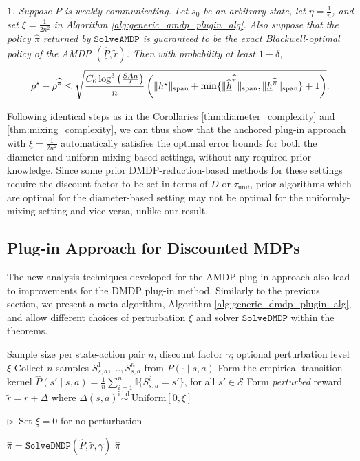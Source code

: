 \documentclass{article}
\theoremstyle{plain}
\newtheorem{thm}{\protect\theoremname}
\theoremstyle{plain}
\theoremstyle{remark}
\theoremstyle{plain}
\theoremstyle{plain}
\providecommand{\theoremname}{Theorem}
\newcommand{\Phat}{\widehat{P}}
\newcommand{\ind}{\mathbb{I}}
\newcommand{\pihat}{\widehat{\pi}}
\newcommand{\hhat}{\widehat{h}}
\newcommand{\A}{\mathcal{A}}
\renewcommand{\S}{\mathcal{S}}
\newcommand{\tmix}{\tau_{\mathrm{unif}}}
\newcommand{\SolveAMDP}{\texttt{SolveAMDP}}
\newcommand{\SolveDMDP}{\texttt{SolveDMDP}}
\newcommand{\Phatanc}{\underline{\Phat}}
\newcommand{\hhatanc}{\underline{\hhat}}
\newcommand{\hanc}{\underline{h}}
\newcommand{\plugin}{plug-in\xspace}
\newcommand{\Plugin}{Plug-in\xspace}
\renewcommand{\algorithmiccomment}[1]{\begin{flushright}$\triangleright$~#1\end{flushright}}
\begin{document}
\begin{thm}
    \label{thm:AMDP_best_of_both}
    Suppose $P$ is weakly communicating. Let $s_0$ be an arbitrary state, let $\eta = \frac{1}{n}$, and set $\xi = \frac{1}{2n^2}$ in Algorithm \ref{alg:generic_amdp_plugin_alg}. Also suppose that the policy $\pihat$ returned by $\SolveAMDP$ is guaranteed to be the exact Blackwell-optimal policy of the AMDP $(\Phatanc, \widetilde{r})$.
    Then with probability at least $1 - \delta$,
    \begin{align*}
        \rho^\star - \rho^{\pihat}  \leq \sqrt{\frac{C_6  \log^3 \left( \frac{SAn}{ \delta }\right) }{n}\left( \spannorm{h^\star} + \min\{\spannorm{\hhatanc^{\pihat}},  \spannorm{\hanc^{\pihat}} \} + 1\right) }.
    \end{align*}
\end{thm}
Following identical steps as in the Corollaries \ref{thm:diameter_complexity} and \ref{thm:mixing_complexity}, we can thus show that the anchored \plugin approach with $\xi = \frac{1}{2n^2}$ automatically satisfies the optimal error bounds for both the diameter and uniform-mixing-based settings, without any required prior knowledge. Since some prior DMDP-reduction-based methods for these settings require the discount factor to be set in terms of $D$ or $\tmix$, prior algorithms which are optimal for the diameter-based setting may not be optimal for the uniformly-mixing setting and vice versa, unlike our result.

\subsection{\Plugin Approach for Discounted MDPs}
The new analysis techniques developed for the AMDP \plugin approach also lead to improvements for the DMDP \plugin method. Similarly to the previous section, we present a meta-algorithm, Algorithm \ref{alg:generic_dmdp_plugin_alg}, and allow different choices of perturbation $\xi$ and solver $\SolveDMDP$ within the theorems.

\begin{algorithm}[t]
\caption{\Plugin approach for DMDP} \label{alg:generic_dmdp_plugin_alg}
\begin{algorithmic}[1]
\Require Sample size per state-action pair $n$, discount factor $\gamma$; optional perturbation level $\xi$
\For{each state-action pair $(s,a) \in \S \times \A$}
\State Collect $n$ samples $S^1_{s,a}, \dots, S^n_{s,a}$ from $P(\cdot \mid s,a)$
\State Form the empirical transition kernel $\Phat(s' \mid s, a) = \frac{1}{n}\sum_{i=1}^n \ind\{S^i_{s,a} = s'\}$, for all $s' \in \S$
\EndFor
\State Form \textit{perturbed} reward $\widetilde{r} = r + \Delta$ where $\Delta(s,a) \stackrel{\text{i.i.d.}}{\sim} \text{Uniform}[0 , \xi]$ \algorithmiccomment{Set $\xi = 0$ for no perturbation}\label{alg:perturbation_step_DMDP}
\State $\pihat = \SolveDMDP(\Phat, \widetilde{r}, \gamma)$
\State \Return $\pihat$
\end{algorithmic}
\end{algorithm}
\end{document}
